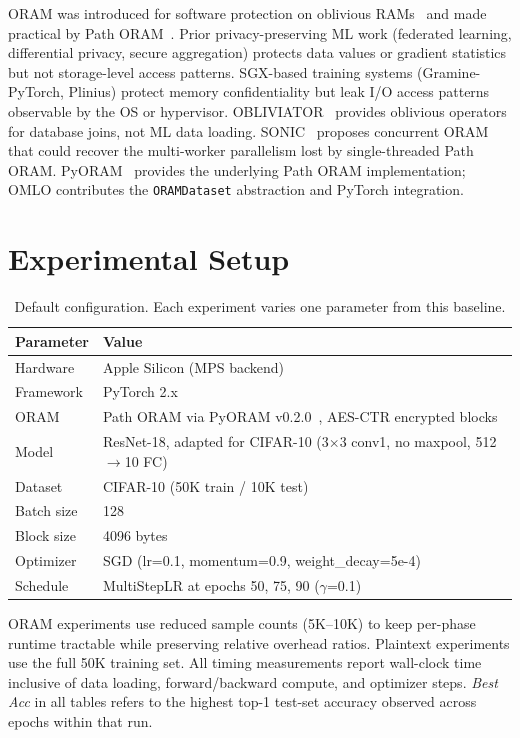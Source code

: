 \documentclass[11pt]{article}
\begin{document}
ORAM was introduced for software protection on oblivious RAMs~\cite{goldreich1996} and made practical by Path ORAM~\cite{stefanov2013}.
Prior privacy-preserving ML work (federated learning, differential privacy, secure aggregation) protects data values or gradient statistics but not storage-level access patterns.
SGX-based training systems (Gramine-PyTorch, Plinius) protect memory confidentiality but leak I/O access patterns observable by the OS or hypervisor.
OBLIVIATOR~\cite{mavrogiannakis2025} provides oblivious operators for database joins, not ML data loading.
SONIC~\cite{talur2026} proposes concurrent ORAM that could recover the multi-worker parallelism lost by single-threaded Path ORAM.
PyORAM~\cite{pyoram} provides the underlying Path ORAM implementation; OMLO contributes the \texttt{ORAMDataset} abstraction and PyTorch integration.

\section{Experimental Setup}
\label{sec:setup}

\begin{table}[ht]
\centering
\caption{Default configuration. Each experiment varies one parameter from this baseline.}
\label{tab:platform}
\begin{tabular}{@{}ll@{}}
\toprule
\textbf{Parameter} & \textbf{Value} \\
\midrule
Hardware      & Apple Silicon (MPS backend) \\
Framework     & PyTorch 2.x \\
ORAM          & Path ORAM via PyORAM v0.2.0~\cite{pyoram}, AES-CTR encrypted blocks \\
Model         & ResNet-18, adapted for CIFAR-10 (3$\times$3 conv1, no maxpool, 512$\to$10 FC) \\
Dataset       & CIFAR-10 (50K train / 10K test) \\
Batch size    & 128 \\
Block size    & 4096 bytes \\
Optimizer     & SGD (lr=0.1, momentum=0.9, weight\_decay=5e-4) \\
Schedule      & MultiStepLR at epochs 50, 75, 90 ($\gamma$=0.1) \\
\bottomrule
\end{tabular}
\end{table}

ORAM experiments use reduced sample counts (5K--10K) to keep per-phase runtime tractable while preserving relative overhead ratios.
Plaintext experiments use the full 50K training set.
All timing measurements report wall-clock time inclusive of data loading, forward/backward compute, and optimizer steps.
\textit{Best Acc} in all tables refers to the highest top-1 test-set accuracy observed across epochs within that run.
\end{document}
